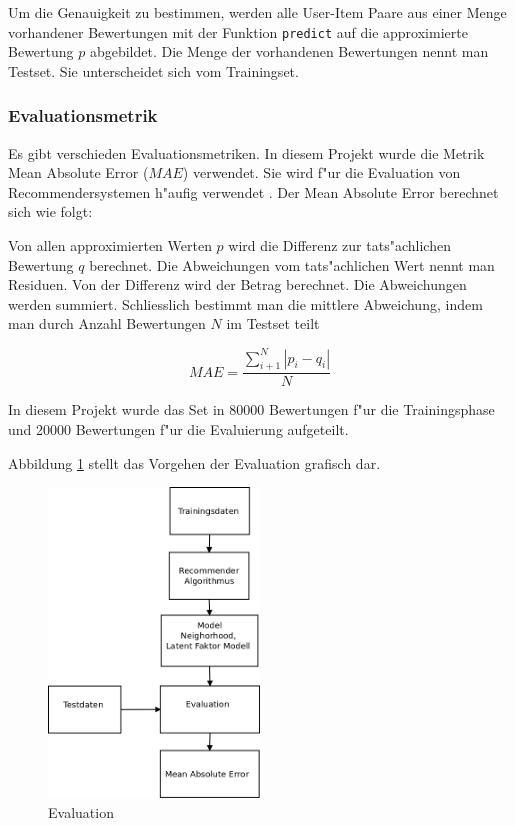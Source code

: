 \documentclass[a4paper, 12pt]{article}
\begin{document}
Um die Genauigkeit zu bestimmen, werden alle User-Item Paare aus einer Menge vorhandener Bewertungen mit der Funktion \verb|predict| auf die approximierte Bewertung $p$ abgebildet. Die Menge der vorhandenen Bewertungen nennt man Testset. Sie unterscheidet sich vom Trainingset.

\subsubsection{Evaluationsmetrik}
\label{sec:evaluationmetrik}

Es gibt verschieden Evaluationsmetriken. In diesem Projekt wurde die Metrik Mean Absolute Error ($MAE$) verwendet. Sie wird f"ur die Evaluation von Recommendersystemen h"aufig verwendet \cite{sarwar01}. Der Mean Absolute Error berechnet sich wie folgt:

Von allen approximierten Werten $p$ wird die Differenz zur tats"achlichen Bewertung $q$ berechnet. Die Abweichungen vom tats"achlichen Wert nennt man Residuen. Von der Differenz wird der Betrag berechnet. Die Abweichungen werden summiert. Schliesslich bestimmt man die mittlere Abweichung, indem man durch Anzahl Bewertungen $N$ im Testset teilt 

\begin{equation}
  \label{eq:mae}
  MAE = \frac{\sum_{i+1}^N | p_i-q_i | }{N}
\end{equation}

In diesem Projekt wurde das Set in 80000 Bewertungen f"ur die Trainingsphase und 20000 Bewertungen f"ur die Evaluierung aufgeteilt.

Abbildung \ref{fig:crossvalidation} stellt das Vorgehen der Evaluation grafisch dar.

\begin{figure}
  \centering
      \includegraphics[width=0.5\textwidth]{evaluation}
  \caption{Evaluation}
  \label{fig:crossvalidation}
\end{figure}
\end{document}
